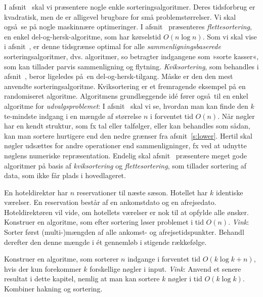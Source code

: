 I afsnit~ skal vi præsentere nogle enkle sorteringsalgoritmer.
Deres tidsforbrug er kvadratisk, men de er alligevel brugbare for små problemstørrelser.
Vi skal også se på nogle maskinnære optimeringer.
I afsnit~ præsenteres \emph{flettesortering}, en enkel del-og-hersk-algoritme, som har kørselstid $O(n\log n)$.
Som vi skal vise i afsnit~, er denne tidsgrænse optimal for alle \emph{sammenligningsbaserede} sorteringsalgoritmer, dvs. algoritmer, so betragter indgangene som »sorte kasser«, som kan tillader parvis sammenligning og flytning.
\emph{Kviksortering}, som behandles i  afsnit~, beror ligeledes på en del-og-hersk-tilgang.
Måske er den den mest anvendte sorteringsalgoritme.
Kviksortering er et fremragende eksempel på en randomiseret algoritme.
Algoritmens grundlæggende idé fører også til en enkel algoritme for \emph{udvalgsproblemet}:
I afsnit~ skal vi se, hvordan man kan finde den $k$te-mindste indgang i en mængde af størrelse $n$ i forventet tid $O(n)$.
Når nøgler har en kendt struktur, som fx tal eller talfølger, eller kan behandles som sådan, kan man sortere hurtigere end den nedre grænser fra afsnit~\ref{s:lower}.
Hertil skal nøgler udsættes for andre operationer end sammenligninger, fx ved at udnytte nøglens numeriske repræsentation.
Endelig skal afsnit~ præsentere meget gode algoritmer på basis af \emph{kviksortering} og \emph{flettesortering}, som tillader sortering af data, som ikke får plads i hovedlageret.

\begin{exerc}
  En hoteldirektør har $n$ reservationer til næste sæson.
  Hotellet har $k$ identiske værelser.
  En reservation består af en ankomstdato og en afrejsedato.
  Hoteldirektøren vil vide, om hotellets værelser er nok til at opfylde alle ønsker.
  Konstruer en algoritme, som efter sortering løser problemet i tid $O(n)$.
  \emph{Vink}: 
  Sorter først (multi-)mængden af alle ankomst- og afrejsetidspunkter.
  Behandl derefter den denne mængde i ét gennemløb i stigende rækkefølge.
\end{exerc}


\begin{exerc}
  Konstruer en algoritme, som sorterer $n$ indgange i forventet tid $O(k\log k + n)$, hvis der kun forekommer $k$ forskellige nøgler i input.
  \emph{Vink}: 
  Anvend et senere resultat i dette kapitel, nemlig at man kan sortere $k$ nøgler i tid $O(k\log k)$. 
  Kombiner hakning og sortering.
\end{exerc}


